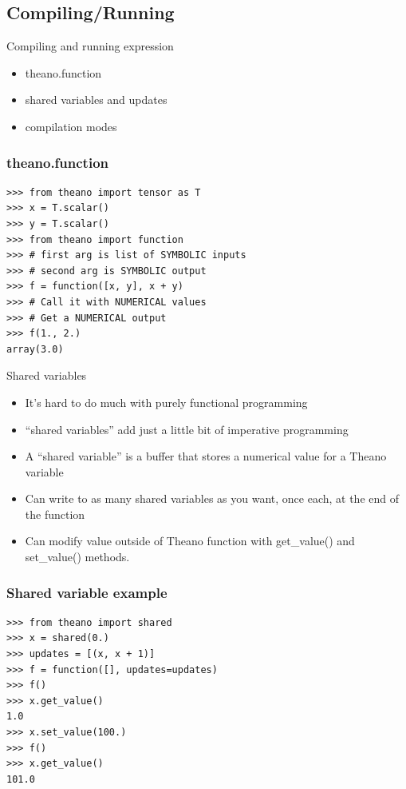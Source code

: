 \documentclass[utf8x,xcolor=pdftex,dvipsnames,table]{beamer}
\begin{document}
\subsection{Compiling/Running}
\begin{frame}{Compiling and running expression}
  \begin{itemize}
  \item theano.function
  \item shared variables and updates
  \item compilation modes
  \end{itemize}
\end{frame}

\begin{frame}[fragile]
  \frametitle{theano.function}

\begin{lstlisting}
>>> from theano import tensor as T
>>> x = T.scalar()
>>> y = T.scalar()
>>> from theano import function
>>> # first arg is list of SYMBOLIC inputs
>>> # second arg is SYMBOLIC output
>>> f = function([x, y], x + y)
>>> # Call it with NUMERICAL values
>>> # Get a NUMERICAL output
>>> f(1., 2.)
array(3.0)
\end{lstlisting}
\end{frame}

\begin{frame}{Shared variables}
  \begin{itemize}
  \item It’s hard to do much with purely functional programming
  \item ``shared variables'' add just a little bit of imperative programming
  \item A ``shared variable'' is a buffer that stores a numerical value for a Theano variable
  \item Can write to as many shared variables as you want, once each, at the end of the function
  \item Can modify value outside of Theano function with get\_value() and set\_value() methods.
  \end{itemize}
\end{frame}

\begin{frame}[fragile]
  \frametitle{Shared variable example}

\begin{lstlisting}
>>> from theano import shared
>>> x = shared(0.)
>>> updates = [(x, x + 1)]
>>> f = function([], updates=updates)
>>> f()
>>> x.get_value()
1.0
>>> x.set_value(100.)
>>> f()
>>> x.get_value()
101.0
\end{lstlisting}
\end{frame}
\end{document}
